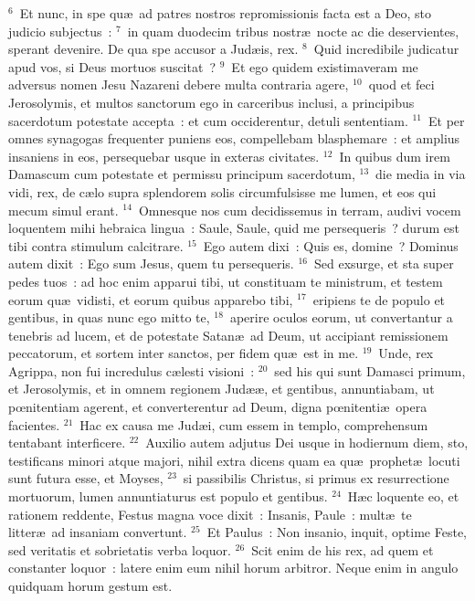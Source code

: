 ${}^{6}$~Et nunc, in spe qu\ae\ ad patres nostros repromissionis facta est a Deo, sto judicio subjectus~:
${}^{7}$~in quam duodecim tribus nostr\ae\ nocte ac die deservientes, sperant devenire. De qua spe accusor a Jud\ae is, rex.
${}^{8}$~Quid incredibile judicatur apud vos, si Deus mortuos suscitat~?
${}^{9}$~Et ego quidem existimaveram me adversus nomen Jesu Nazareni debere multa contraria agere,
${}^{10}$~quod et feci Jerosolymis, et multos sanctorum ego in carceribus inclusi, a principibus sacerdotum potestate accepta~: et cum occiderentur, detuli sententiam.
${}^{11}$~Et per omnes synagogas frequenter puniens eos, compellebam blasphemare~: et amplius insaniens in eos, persequebar usque in exteras civitates.
${}^{12}$~In quibus dum irem Damascum cum potestate et permissu principum sacerdotum,
${}^{13}$~die media in via vidi, rex, de c\ae lo supra splendorem solis circumfulsisse me lumen, et eos qui mecum simul erant.
${}^{14}$~Omnesque nos cum decidissemus in terram, audivi vocem loquentem mihi hebraica lingua~: Saule, Saule, quid me persequeris~? durum est tibi contra stimulum calcitrare.
${}^{15}$~Ego autem dixi~: Quis es, domine~? Dominus autem dixit~: Ego sum Jesus, quem tu persequeris.
${}^{16}$~Sed exsurge, et sta super pedes tuos~: ad hoc enim apparui tibi, ut constituam te ministrum, et testem eorum qu\ae\ vidisti, et eorum quibus apparebo tibi,
${}^{17}$~eripiens te de populo et gentibus, in quas nunc ego mitto te,
${}^{18}$~aperire oculos eorum, ut convertantur a tenebris ad lucem, et de potestate Satan\ae\ ad Deum, ut accipiant remissionem peccatorum, et sortem inter sanctos, per fidem qu\ae\ est in me.
${}^{19}$~Unde, rex Agrippa, non fui incredulus c\ae lesti visioni~:
${}^{20}$~sed his qui sunt Damasci primum, et Jerosolymis, et in omnem regionem Jud\ae \ae , et gentibus, annuntiabam, ut pœnitentiam agerent, et converterentur ad Deum, digna pœnitenti\ae\ opera facientes.
${}^{21}$~Hac ex causa me Jud\ae i, cum essem in templo, comprehensum tentabant interficere.
${}^{22}$~Auxilio autem adjutus Dei usque in hodiernum diem, sto, testificans minori atque majori, nihil extra dicens quam ea qu\ae\ prophet\ae\ locuti sunt futura esse, et Moyses,
${}^{23}$~si passibilis Christus, si primus ex resurrectione mortuorum, lumen annuntiaturus est populo et gentibus.
${}^{24}$~H\ae c loquente eo, et rationem reddente, Festus magna voce dixit~: Insanis, Paule~: mult\ae\ te litter\ae\ ad insaniam convertunt.
${}^{25}$~Et Paulus~: Non insanio, inquit, optime Feste, sed veritatis et sobrietatis verba loquor.
${}^{26}$~Scit enim de his rex, ad quem et constanter loquor~: latere enim eum nihil horum arbitror. Neque enim in angulo quidquam horum gestum est.
